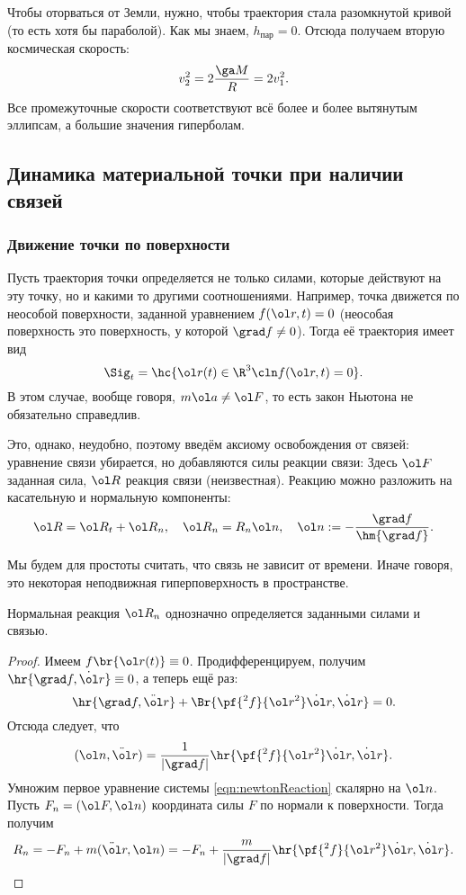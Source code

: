 \documentclass[a4paper,12pt]{article}
\def\F{\ol F}
\def\a{\ol a}
\def\n{\ol n}
\def\r{\ol r}
\def\vR{\ol R}
\def\dd{\ddot}
\def\d{\dot}
\newcommand{\ez}{\equiv0}
\begin{document}
Чтобы оторваться от Земли, нужно, чтобы траектория стала разомкнутой кривой (то есть хотя бы параболой).
Как мы знаем, $h_{\text{пар}}=0$.
Отсюда получаем вторую космическая скорость:
$$v_2^2=2\frac{\ga M}{R}=2v_1^2.$$
Все промежуточные скорости соответствуют всё более и более вытянутым эллипсам,
а большие значения гиперболам.

\subsection{Динамика материальной точки при наличии связей}

\subsubsection{Движение точки по поверхности}

Пусть траектория точки определяется не только силами, которые действуют на эту точку,
но и какими то другими соотношениями. Например, точка движется по неособой поверхности,
заданной уравнением $f(\r,t) = 0$ (неособая поверхность это поверхность, у которой ${\grad f \ne 0}$).
Тогда её траектория имеет вид
$$\Sig_t=\hc{\r(t)\in\R^3\cln f(\r,t)=0}.$$
В этом случае, вообще говоря, $m\a\ne\F$, то есть закон Ньютона не обязательно справедлив.

Это, однако, неудобно, поэтому введём аксиому освобождения от связей:
уравнение связи убирается, но добавляются силы реакции связи:
\eqn{\label{eqn:newtonReaction}
\bcase{
&m\dd\r=\F(\d\r,\r,t)+\vR(\d\r, \r, t), \\
&f(\r,t)=0.}}
Здесь $\F$ заданная сила, $\vR$ реакция связи (неизвестная).
Реакцию можно разложить на касательную и нормальную компоненты:
$$\vR=\vR_t+\vR_n,\quad \vR_n=R_n\n,\quad \n:=-\frac{\grad f}{\hm{\grad f}}.$$

Мы будем для простоты считать, что связь не зависит от времени.
Иначе говоря, это некоторая неподвижная гиперповерхность в пространстве.

\begin{stm}
Нормальная реакция $\vR_n$ однозначно определяется заданными силами и связью.
\end{stm}
\begin{proof}
Имеем $f\br{\r(t)} \equiv 0$. Продифференцируем, получим $\hr{\grad f,\d\r}\ez$, а теперь ещё раз:
$$\hr{\grad f,\dd\r}+\Br{\pf{^2f}{\r^2}\d\r, \d\r}=0.$$
Отсюда следует, что $$(\ol n,\dd \r)=\frac{1}{|\grad f|}\hr{\pf{^2f}{\r^2}\d\r,\d\r}.$$
Умножим первое уравнение системы \eqref{eqn:newtonReaction} скалярно на $\n$. Пусть $F_n=(\F,\n)$ координата
силы $F$ по нормали к поверхности. Тогда получим
$$R_n=-F_n+m(\dd\r,\n)=-F_n+\frac{m}{|\grad f|}\hr{\pf{^2f}{\r^2}\d\r,\d\r}.$$
\hfill\end{proof}
\end{document}
